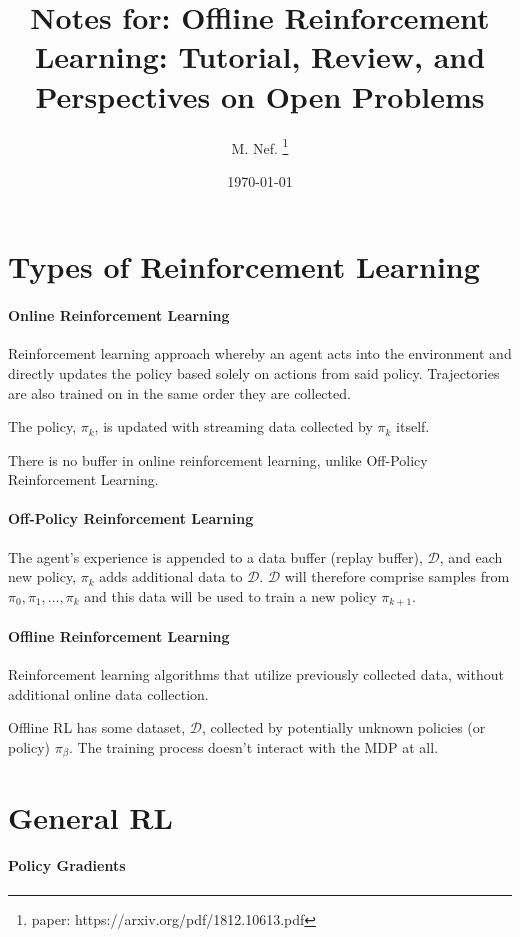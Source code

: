 \documentclass{article}
\title{Notes for: Offline Reinforcement Learning: Tutorial, Review, and Perspectives on Open Problems}
\author{M. Nef. \thanks{paper: https://arxiv.org/pdf/1812.10613.pdf}}
\date{\today}
\begin{document}
\maketitle

\section{Types of Reinforcement Learning}
\paragraph{Online Reinforcement Learning}
Reinforcement learning approach whereby an agent acts into the environment and directly updates the policy based solely on actions from said policy. Trajectories are also trained on in the same order they are collected.

The policy, \(\pi_k\), is updated with streaming data collected by \(\pi_k\) itself.

There is no buffer in online reinforcement learning, unlike Off-Policy Reinforcement Learning.

\paragraph{Off-Policy Reinforcement Learning} The agent's experience is appended to a data buffer (replay buffer), \(\mathcal{D}\), and each new policy, \(\pi_k\) adds additional data to \(\mathcal{D}\).
\(\mathcal{D}\) will therefore comprise samples from \( \pi_0 , \pi_1 , \dots, \pi_k\) and this data will be used to train a new policy \(\pi_{k+1}\).

\paragraph{Offline Reinforcement Learning}
Reinforcement learning algorithms that utilize previously collected data, without additional online data collection.

Offline RL has some dataset, \(\mathcal{D}\), collected by potentially unknown policies (or policy) \(\pi_\beta\).
The training process doesn't interact with the MDP at all.

\section{General RL}
\pagebreak
\paragraph{Policy Gradients}
\end{document}
